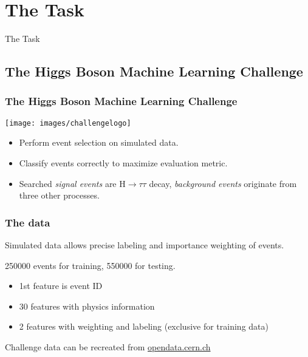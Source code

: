 \section{The Task}

\begin{frame}
	\begin{center}
	\Large{The Task}
	\end{center}
\end{frame}

\subsection{The Higgs Boson Machine Learning Challenge}
\begin{frame}
	\frametitle{The Higgs Boson Machine Learning Challenge}
	\begin{center}
	\texttt{[image: images/challengelogo]}
	\end{center}
	\begin{itemize}
		\item Perform event selection on simulated data.
		\item Classify events correctly to maximize evaluation metric.
		\item Searched \emph{signal events} are $\mathrm{H}\rightarrow\tau\tau$ decay, \emph{background events} originate from three other processes.
	\end{itemize}
\end{frame}

\begin{frame}
	\frametitle{The data}
	Simulated data allows precise labeling and importance weighting of events.
	
	\vspace{2ex}
	250000 events for training, 550000 for testing.
	\begin{itemize}
		\item 1st feature is event ID
		\item 30 features with physics information
		\item 2 features with weighting and labeling (exclusive for training data)
	\end{itemize}
	\vspace{2ex}
	\small{Challenge data can be recreated from \url{opendata.cern.ch}}
\end{frame}

